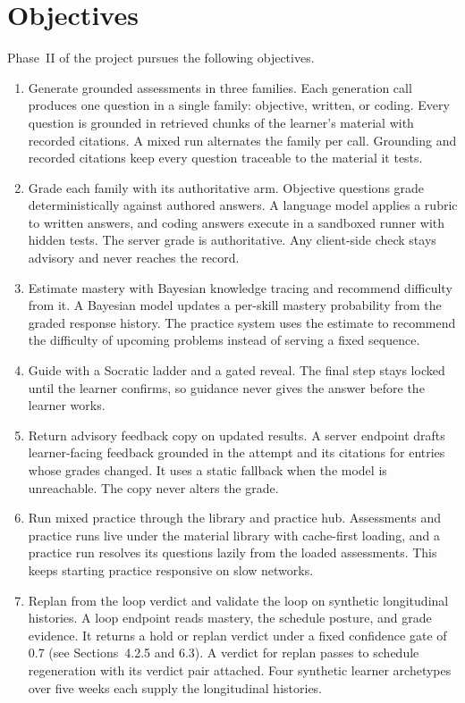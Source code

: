 \section{Objectives}
Phase~II of the project pursues the following objectives.
\begin{enumerate}
\item Generate grounded assessments in three families. Each generation call produces one question in a single family: objective, written, or coding. Every question is grounded in retrieved chunks of the learner's material with recorded citations. A mixed run alternates the family per call. Grounding and recorded citations keep every question traceable to the material it tests.

\item Grade each family with its authoritative arm. Objective questions grade deterministically against authored answers. A language model applies a rubric to written answers, and coding answers execute in a sandboxed runner with hidden tests. The server grade is authoritative. Any client-side check stays advisory and never reaches the record.

\item Estimate mastery with Bayesian knowledge tracing and recommend difficulty from it. A Bayesian model updates a per-skill mastery probability from the graded response history. The practice system uses the estimate to recommend the difficulty of upcoming problems instead of serving a fixed sequence.

\item Guide with a Socratic ladder and a gated reveal. The final step stays locked until the learner confirms, so guidance never gives the answer before the learner works.

\item Return advisory feedback copy on updated results. A server endpoint drafts learner-facing feedback grounded in the attempt and its citations for entries whose grades changed. It uses a static fallback when the model is unreachable. The copy never alters the grade.

\item Run mixed practice through the library and practice hub. Assessments and practice runs live under the material library with cache-first loading, and a practice run resolves its questions lazily from the loaded assessments. This keeps starting practice responsive on slow networks.

\item Replan from the loop verdict and validate the loop on synthetic longitudinal histories. A loop endpoint reads mastery, the schedule posture, and grade evidence. It returns a hold or replan verdict under a fixed confidence gate of 0.7 (see Sections~4.2.5 and 6.3). A verdict for replan passes to schedule regeneration with its verdict pair attached. Four synthetic learner archetypes over five weeks each supply the longitudinal histories.
\end{enumerate}


